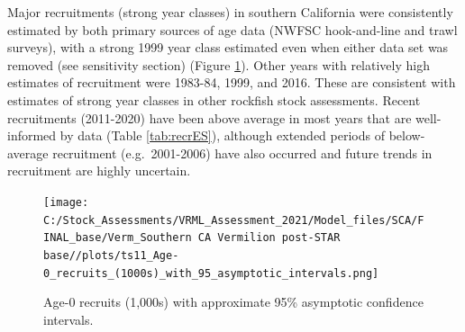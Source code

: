 \documentclass[11pt,
  english,
]{article}
\begin{document}
\leavevmode\tagmcend\tagstructend

Major recruitments (strong year classes) in southern California were consistently estimated by both primary sources of age data (NWFSC hook-and-line and trawl surveys), with a strong 1999 year class estimated even when either data set was removed (see sensitivity section) (Figure \ref{fig:recruitsES}). Other years with relatively high estimates of recruitment were 1983-84, 1999, and 2016. These are consistent with estimates of strong year classes in other rockfish stock assessments. Recent recruitments (2011-2020) have been above average in most years that are well-informed by data (Table \ref{tab:recrES}), although extended periods of below-average recruitment (e.g.~2001-2006) have also occurred and future trends in recruitment are highly uncertain.

\begin{figure}
\centering
\texttt{[image: C:/Stock\_Assessments/VRML\_Assessment\_2021/Model\_files/SCA/FINAL\_base/Verm\_Southern CA Vermilion post-STAR base//plots/ts11\_Age-0\_recruits\_(1000s)\_with\_95\_asymptotic\_intervals.png]}
\caption{Age-0 recruits (1,000s) with approximate 95\% asymptotic confidence intervals.\label{fig:recruitsES}}
\end{figure}
\end{document}
